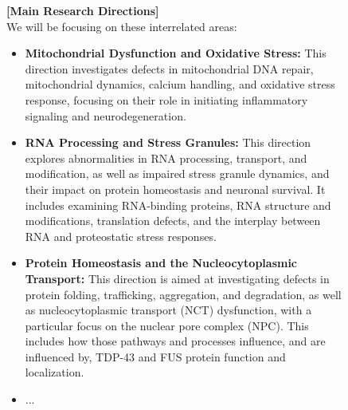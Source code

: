 \begin{figure}[htbp!]
\begin{tcolorbox}[
    colback=black!5!white,
    colframe=black!60!white,
    title=\textbf{Example of a research overview by the Meta-review agent},
    fonttitle=\bfseries,
    arc=3mm,
    boxrule=1pt,
    bottomrule=2pt,
]
\footnotesize
\textbf{[Main Research Directions]}
\\
We will be focusing on these interrelated areas:
\begin{itemize}
    \item \textbf{Mitochondrial Dysfunction and Oxidative Stress:} This direction investigates defects in mitochondrial DNA repair, mitochondrial dynamics, calcium handling, and oxidative stress response, focusing on their role in initiating inflammatory signaling and neurodegeneration.
    \item \textbf{RNA Processing and Stress Granules:} This direction explores abnormalities in RNA processing, transport, and modification, as well as impaired stress granule dynamics, and their impact on protein homeostasis and neuronal survival. It includes examining RNA-binding proteins, RNA structure and modifications, translation defects, and the interplay between RNA and proteostatic stress responses.
    \item \textbf{Protein Homeostasis and the Nucleocytoplasmic Transport:} This direction is aimed at investigating defects in protein folding, trafficking, aggregation, and degradation, as well as nucleocytoplasmic transport (NCT) dysfunction, with a particular focus on the nuclear pore complex (NPC). This includes how those pathways and processes influence, and are influenced by, TDP-43 and FUS protein function and localization.
    \item ...
\end{itemize}


\end{tcolorbox}
\end{figure}
